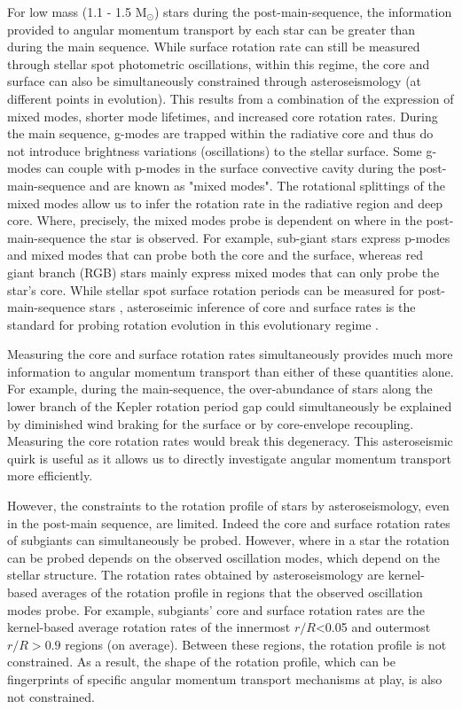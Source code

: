 For low mass (1.1 - 1.5 M$_{\odot}$) stars during the post-main-sequence, the information provided to angular momentum transport by each star can be greater than during the main sequence.
While surface rotation rate can still be measured through stellar spot photometric oscillations, within this regime, the core and surface can also be simultaneously constrained through asteroseismology (at different points in evolution). 
This results from a combination of the expression of mixed modes, shorter mode lifetimes, and increased core rotation rates.
During the main sequence, g-modes are trapped within the radiative core and thus do not introduce brightness variations (oscillations) to the stellar surface.
Some g-modes can couple with p-modes in the surface convective cavity during the post-main-sequence and are known as "mixed modes".
The rotational splittings of the mixed modes allow us to infer the rotation rate in the radiative region and deep core. \citep{metcalfe_precise_2010,bedding_gravity_2011}
Where, precisely, the mixed modes probe is dependent on where in the post-main-sequence the star is observed.
For example, sub-giant stars express p-modes and mixed modes that can probe both the core and the surface, whereas red giant branch (RGB) stars mainly express mixed modes that can only probe the star's core.
While stellar spot surface rotation periods can be measured for post-main-sequence stars \citet{mcquillan_rotation_2014, ceillier_surface_2017}, asteroseimic inference of core and surface rates is the standard for probing rotation evolution in this evolutionary regime \citep{deheuvels_seismic_2014, gehan_core_2018, deheuvels_seismic_2020, fellay_asteroseismology_2021}.

Measuring the core and surface rotation rates simultaneously provides much more information to angular momentum transport than either of these quantities alone.
For example, during the main-sequence, the over-abundance of stars along the lower branch of the Kepler rotation period gap could simultaneously be explained by diminished wind braking for the surface or by core-envelope recoupling.
Measuring the core rotation rates would break this degeneracy.
This asteroseismic quirk is useful as it allows us to directly investigate angular momentum transport more efficiently.

However, the constraints to the rotation profile of stars by asteroseismology, even in the post-main sequence, are limited.
Indeed the core and surface rotation rates of subgiants can simultaneously be probed.
However, where in a star the rotation can be probed depends on the observed oscillation modes, which depend on the stellar structure.
The rotation rates obtained by asteroseismology are kernel-based averages of the rotation profile in regions that the observed oscillation modes probe.
For example, subgiants' core and surface rotation rates are the kernel-based average rotation rates of the innermost $r/R$<0.05 and outermost $r/R>0.9$ regions (on average).
Between these regions, the rotation profile is not constrained.
As a result, the shape of the rotation profile, which can be fingerprints of specific angular momentum transport mechanisms at play, is also not constrained.

